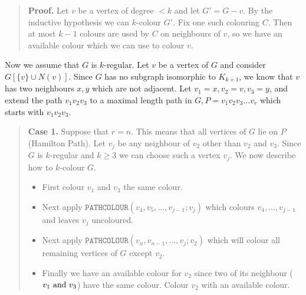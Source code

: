 \begin{theorem}[Brooks, 1941]
{\begin{quote}
            {\bf Proof.} Let \(v\) be a vertex of degree \(< k\) and let \(G' = G - v\). By the inductive hypothesis we can \(k\)-colour \(G'\). Fix one such colouring \(C\). Then at most \(k - 1\) colours are used by \(C\) on neighbours of \(v\), so we have an available colour which we can use to colour \(v\).
        \end{quote}
        Now we assume that \(G\) is \(k\)-regular. Let \(v\) be a vertex of \(G\) and consider \(G[\{v\} \cup N(v)]\). Since \(G\) has no subgraph isomorphic to \(K_{k + 1}\), we know that \(v\) has two neighbours \(x, y\) which are not adjacent. Let \(v_1 = x, v_2 = v, v_3 = y\), and extend the path \(v_1 v_2 v_3\) to a maximal length path in \(G, P = v_1v_2v_3 \dots v_r\) which starts with \(v_1v_2v_3\).
        \begin{quote}
            {\bf Case 1.} Suppose that \(r = n\). This means that all vertices of \(G\) lie on \(P\) (Hamilton Path). Let \(v_j\) be any neighbour of \(v_2\) other than \(v_2\) and \(v_3\). Since \(G\) is \(k\)-regular and \(k \geq 3\) we can choose such a vertex \(v_j\). We now describe how to \(k\)-colour \(G\).
            \begin{itemize}
                \item First colour \(v_1\) and \(v_3\) the same colour.
                \item Next apply \(\texttt{PATHCOLOUR}(v_4, v_5, \dots, v_{j - 1};v_j)\) which colours \(v_4, \dots, v_{j-1}\) and leaves \(v_j\) uncoloured.
                \item Next apply \(\texttt{PATHCOLOUR}(v_n, v_{n - 1}, \dots, v_j ; v_2)\) which will colour all remaining vertices of \(G\) except \(v_2\).
                \item Finally we have an available colour for \(v_2\) since two of its neighbour (\(v_1 \text{ and } v_3\)) have the same colour. Colour \(v_2\) with an available colour.
            \end{itemize}


\end{quote}}
\end{theorem}
